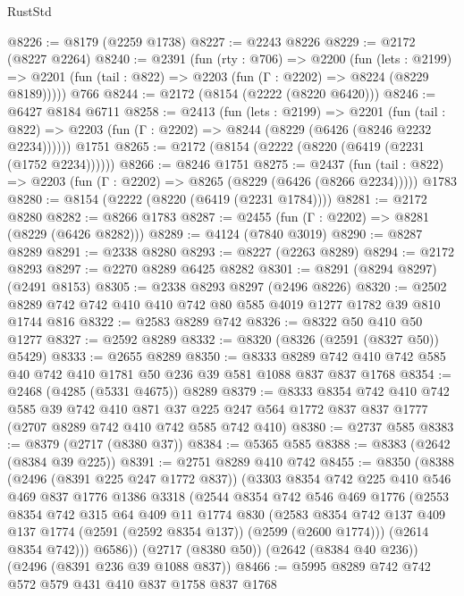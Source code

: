 \begin{lexlean}{RustStd}
\begin{coremodule}
@8226 := @8179 (@2259 @1738)
@8227 := @2243 @8226
@8229 := @2172 (@8227 @2264)
@8240 := @2391
    (fun (rty : @706) =>
    @2200
      (fun (lets : @2199) =>
      @2201 (fun (tail : @822) => @2203 (fun (Γ : @2202) => @8224 (@8229 @8189)))))
    @766
@8244 := @2172 (@8154 (@2222 (@8220 @6420)))
@8246 := @6427 @8184 @6711
@8258 := @2413
    (fun (lets : @2199) =>
    @2201
      (fun (tail : @822) => @2203 (fun (Γ : @2202) => @8244 (@8229 (@6426 (@8246 @2232 @2234))))))
    @1751
@8265 := @2172 (@8154 (@2222 (@8220 (@6419 (@2231 (@1752 @2234))))))
@8266 := @8246 @1751
@8275 := @2437
    (fun (tail : @822) => @2203 (fun (Γ : @2202) => @8265 (@8229 (@6426 (@8266 @2234)))))
    @1783
@8280 := @8154 (@2222 (@8220 (@6419 (@2231 @1784))))
@8281 := @2172 @8280
@8282 := @8266 @1783
@8287 := @2455 (fun (Γ : @2202) => @8281 (@8229 (@6426 @8282)))
@8289 := @4124 (@7840 @3019)
@8290 := @8287 @8289
@8291 := @2338 @8280
@8293 := @8227 (@2263 @8289)
@8294 := @2172 @8293
@8297 := @2270 @8289 @6425 @8282
@8301 := @8291 (@8294 @8297) (@2491 @8153)
@8305 := @2338 @8293 @8297 (@2496 @8226)
@8320 := @2502 @8289 @742 @742 @410 @410 @742 @80 @585 @4019 @1277 @1782 @39 @810 @1744 @816
@8322 := @2583 @8289 @742
@8326 := @8322 @50 @410 @50 @1277
@8327 := @2592 @8289
@8332 := @8320 (@8326 (@2591 (@8327 @50)) @5429)
@8333 := @2655 @8289
@8350 := @8333 @8289 @742 @410 @742 @585 @40 @742 @410 @1781 @50 @236 @39 @581 @1088 @837 @837 @1768
@8354 := @2468 (@4285 (@5331 @4675)) @8289
@8379 := @8333
    @8354
    @742
    @410
    @742
    @585
    @39
    @742
    @410
    @871
    @37
    @225
    @247
    @564
    @1772
    @837
    @837
    @1777
    (@2707 @8289 @742 @410 @742 @585 @742 @410)
@8380 := @2737 @585
@8383 := @8379 (@2717 (@8380 @37))
@8384 := @5365 @585
@8388 := @8383 (@2642 (@8384 @39 @225))
@8391 := @2751 @8289 @410 @742
@8455 := @8350
    (@8388
      (@2496 (@8391 @225 @247 @1772 @837))
      (@3303
        @8354
        @742
        @225
        @410
        @546
        @469
        @837
        @1776
        @1386
        @3318
        (@2544
          @8354
          @742
          @546
          @469
          @1776
          (@2553
            @8354
            @742
            @315
            @64
            @409
            @11
            @1774
            @830
            (@2583 @8354 @742 @137 @409 @137 @1774 (@2591 (@2592 @8354 @137)) (@2599 (@2600 @1774)))
            (@2614 @8354 @742)))
        @6586))
    (@2717 (@8380 @50))
    (@2642 (@8384 @40 @236))
    (@2496 (@8391 @236 @39 @1088 @837))
@8466 := @5995 @8289 @742 @742 @572 @579 @431 @410 @837 @1758 @837 @1768

\end{coremodule}
\end{lexlean}
